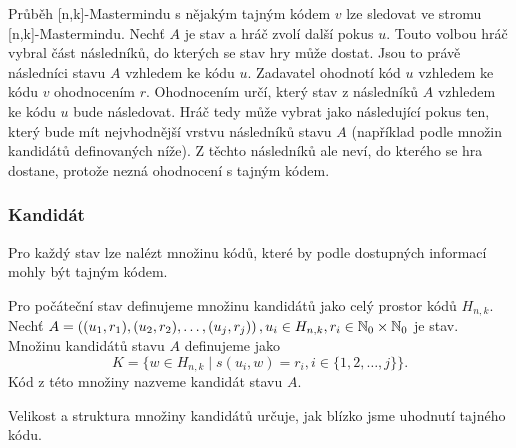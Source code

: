 Průběh [n,k]-Mastermindu s nějakým tajným kódem $v$ lze sledovat ve stromu [n,k]-Mastermindu. Nechť $A$ je stav a hráč zvolí další pokus $u$. Touto volbou hráč vybral část následníků, do kterých se stav hry může dostat. Jsou to právě následníci stavu $A$ vzhledem ke kódu $u$. Zadavatel ohodnotí kód $u$ vzhledem ke kódu $v$ ohodnocením $r$. Ohodnocením určí, který stav z následníků $A$ vzhledem ke kódu $u$ bude následovat. Hráč tedy může vybrat jako následující pokus ten, který bude mít nejvhodnější vrstvu následníků stavu $A$ (například podle množin kandidátů definovaných níže). Z těchto následníků ale neví, do kterého se hra dostane, protože nezná ohodnocení s tajným kódem. 


\subsubsection{Kandidát}
Pro každý stav lze nalézt množinu kódů, které by podle dostupných informací mohly být tajným kódem. 

\begin{definice}\label{kandidat}
  Pro počáteční stav definujeme množinu kandidátů jako celý prostor kódů $H_{n,k}$. Nechť $A = \left((u_1, r_1), (u_2,r_2), \dots, (u_j,r_j)\right), u_i \in H_{n,k}, r_i \in \mathbb{N} _0 \times \mathbb{N} _0$ je stav. Množinu kandidátů stavu $A$ definujeme jako
  \[K = \{w \in H_{n,k} \mid s(u_i,w) = r_i,  i \in \{1,2,\dots ,j\} \}.\]
  Kód z této množiny nazveme kandidát stavu $A$. 
  

\end{definice}
Velikost a struktura množiny kandidátů určuje, jak blízko jsme uhodnutí tajného kódu.



